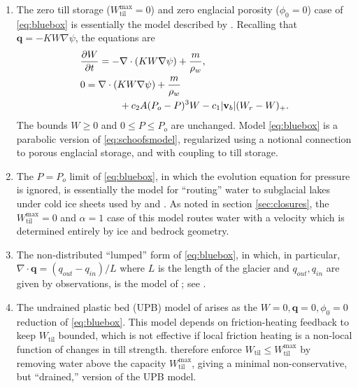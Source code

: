 \documentclass[gmd]{copernicus}   %
\newcommand{\text}{\textrm}
\newcommand\bv{\mathbf{v}}
\newcommand\bq{\mathbf{q}}
\newcommand{\Div}{\nabla\cdot}
\newcommand{\grad}{\nabla}
\newcommand{\Wtil}{W_{\text{til}}}
\newcommand{\Wtilmax}{W_{\text{til}}^{\text{max}}}
\begin{document}
\renewcommand{\labelenumi}{\textbf{(\roman{enumi})}}
\begin{enumerate}
\item The zero till storage ($\Wtilmax=0$) and zero englacial porosity ($\phi_0=0$) case of \eqref{eq:bluebox} is essentially the model described by \cite{Schoofetal2012}.  Recalling that $\bq = - K W \grad \psi$, the equations are
\begin{align}
&\frac{\partial W}{\partial t} = - \Div\left( K W \grad \psi \right) + \frac{m}{\rho_w}, \label{eq:schoofsmodel} \\
&0 = \Div \left( K W \grad \psi \right) + \frac{m}{\rho_w} \notag \\
&\qquad \qquad + c_2 A (P_o - P)^3 W - c_1 |\bv_b| (W_r - W)_+.  \notag
\end{align}
The bounds $W \ge 0$ and $0 \le P \le P_o$ are unchanged.  Model \eqref{eq:bluebox} is a parabolic version of \eqref{eq:schoofsmodel}, regularized using a notional connection to porous englacial storage, and with coupling to till storage.

\item The $P=P_o$ limit of \eqref{eq:bluebox}, in which the evolution equation for pressure is ignored, is essentially the model for ``routing'' water to subglacial lakes under cold ice sheets used by \cite{Siegertetal2009} and \cite{Livingstoneetal2013}.  As noted in section \ref{sec:closures}, the $\Wtilmax=0$ and $\alpha=1$ case of this model routes water with a velocity which is determined entirely by ice and bedrock geometry.

\item The non-distributed ``lumped'' form of \eqref{eq:bluebox}, in which, in particular, $\Div \bq = (q_{out} - q_{in})/L$ where $L$ is the length of the glacier and $q_{out},q_{in}$ are given by observations, is the model of \cite{Bartholomausetal2011}; see \cite{Bueler2014correspondence}.

\item The undrained plastic bed (UPB) model of \cite{Tulaczyketal2000b} arises as the $W=0,\bq=0,\phi_0=0$ reduction of \eqref{eq:bluebox}.  This model depends on friction-heating feedback to keep $\Wtil$ bounded, which is not effective if local friction heating is a non-local function of changes in till strength.  \cite{BBssasliding} therefore enforce $\Wtil \le \Wtilmax$ by removing water above the capacity $\Wtilmax$, giving a minimal non-conservative, but ``drained,'' version of the UPB model.
\end{enumerate}
\end{document}
